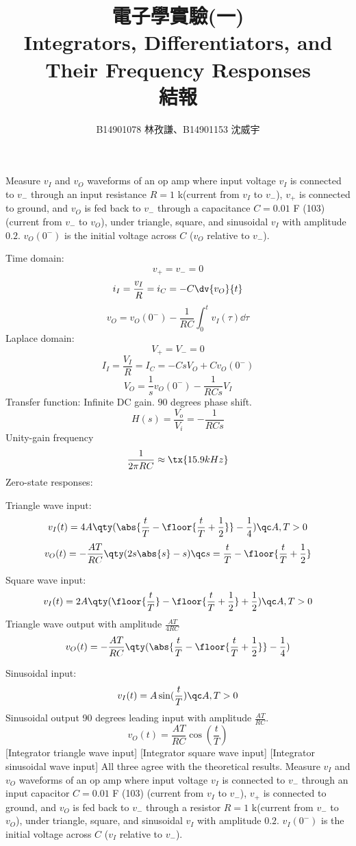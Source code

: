 \documentclass[a4paper,12pt]{article}
\begin{document}
\title{電子學實驗(一)\\Integrators, Differentiators, and Their Frequency Responses\\結報}
\author{B14901078 林孜謙、B14901153 沈威宇}
\date{}
\titledoc
{}
Measure $v_I$ and $v_O$ waveforms of an op amp where input voltage $v_I$ is connected to $v_-$ through an input resistance $R=1$ k\textOmega (current from $v_I$ to $v_-$), $v_+$ is connected to ground, and $v_O$ is fed back to $v_-$ through a capacitance $C=0.01$ \textmu{}F (103) (current from $v_-$ to $v_O$), under triangle, square, and sinusoidal $v_I$ with amplitude $0.2$.
$v_O(0^-)$ is the initial voltage across $C$ ($v_O$ relative to $v_-$).

Time domain:
\[v_+=v_-=0\]
\[i_I=\frac{v_I}{R}=i_C=-C\dv{v_O}{t}\]
\[v_O=v_O(0^-)-\frac{1}{RC}\int_0^tv_I(\tau)\dd{\tau}\]
Laplace domain:
\[V_+=V_-=0\]
\[I_I=\frac{V_I}{R}=I_C=-CsV_O+Cv_O(0^-)\]
\[V_O=\frac{1}{s}v_O(0^-)-\frac{1}{RCs}V_I\]
Transfer function: Infinite DC gain. $90$ degrees phase shift.
\[H(s)=\frac{V_o}{V_i}=-\frac{1}{RCs}\]
Unity-gain frequency
\[\frac{1}{2\pi RC}\approx\tx{15.9 kHz}\]
Zero-state responses:
\bit
\item Triangle wave input:
\[v_I(t)=4A\qty(\abs{\frac{t}{T}-\floor{\frac{t}{T}+\frac{1}{2}}}-\frac{1}{4})\qc A,T>0\]
\[v_O(t)=-\frac{AT}{RC}\qty(2s\abs{s}-s)\qc s=\frac{t}{T}-\floor{\frac{t}{T}+\frac{1}{2}}\]
\item Square wave input:
\[v_I(t)=2A\qty(\floor{\frac{t}{T}}-\floor{\frac{t}{T}+\frac{1}{2}}+\frac{1}{2})\qc A,T>0\]
Triangle wave output with amplitude $\frac{AT}{4RC}$
\[v_O(t)=-\frac{AT}{RC}\qty(\abs{\frac{t}{T}-\floor{\frac{t}{T}+\frac{1}{2}}}-\frac{1}{4})\]
\item Sinusoidal input:
\[v_I(t)=A\sin(\frac{t}{T})\qc A,T>0\]
Sinusoidal output 90 degrees leading input with amplitude $\frac{AT}{RC}$.
\[v_O(t)=\frac{AT}{RC}\cos(\frac{t}{T})\]
\eit
{}
[Integrator triangle wave input]
[Integrator square wave input]
[Integrator sinusoidal wave input]
All three agree with the theoretical results.
Measure $v_I$ and $v_O$ waveforms of an op amp where input voltage $v_I$ is connected to $v_-$ through an input capacitor $C=0.01$ \textmu{}F (103) (current from $v_I$ to $v_-$), $v_+$ is connected to ground, and $v_O$ is fed back to $v_-$ through a resistor $R=1$ k\textOmega (current from $v_-$ to $v_O$), under triangle, square, and sinusoidal $v_I$ with amplitude $0.2$.
$v_I(0^-)$ is the initial voltage across $C$ ($v_I$ relative to $v_-$).
\end{document}
